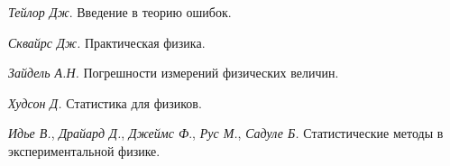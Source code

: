 \documentclass[a5paper,10pt,oneside]{report}
\begin{document}
% 





\begin{thebibliography}{1}

 \textit{Тейлор Дж}. Введение в теорию ошибок.

 \textit{Сквайрс Дж.} Практическая физика.

 \textit{Зайдель А.Н.} Погрешности измерений физических величин.

 \textit{Худсон Д.} Статистика для физиков.

 \textit{Идье В.}, \textit{Драйард Д.}, \textit{Джеймс Ф}., \textit{Рус М.}, \textit{Садуле Б.} Статистические методы в экспериментальной физике.

\end{thebibliography}
\end{document}
